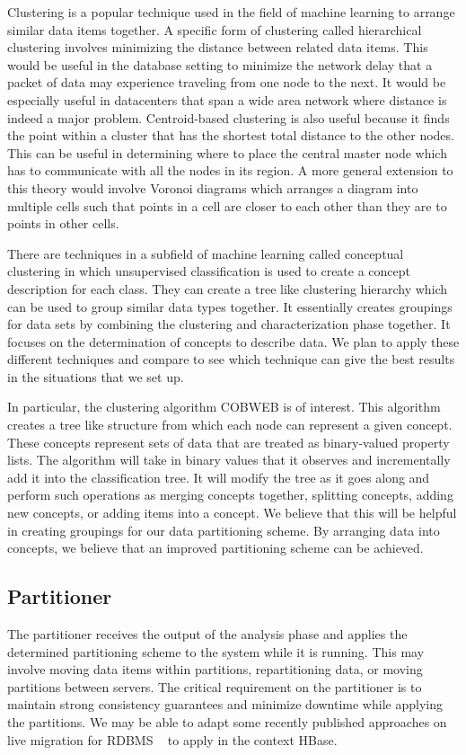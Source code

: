 \documentclass[10pt,final,journal]{IEEEtran}
\begin{document}
Clustering is a popular technique used in the field of machine learning to arrange similar data items together.  A specific form of clustering called hierarchical clustering involves minimizing the distance between related data items.  This would be useful in the database setting to minimize the network delay that a packet of data may experience traveling from one node to the next.  It would be especially useful in datacenters that span a wide area network where distance is indeed a major problem.  Centroid-based clustering is also useful because it finds the point within a cluster that has the shortest total distance to the other nodes.  This can be useful in determining where to place the central master node which has to communicate with all the nodes in its region.  A more general extension to this theory would involve Voronoi diagrams which arranges a diagram into multiple cells such that points in a cell are closer to each other than they are to points in other cells.

There are techniques in a subfield of machine learning called conceptual clustering in which unsupervised classification is used to create a concept description for each class. They can create a tree like clustering hierarchy which can be used to group similar data types together. It essentially creates groupings for data sets by combining the clustering and characterization phase together. It focuses on the determination of concepts to describe data. We plan to apply these different techniques and compare to see which technique can give the best results in the situations that we set up.

In particular, the clustering algorithm COBWEB is of interest. This algorithm creates a tree like structure from which each node can represent a given concept. These concepts represent sets of data that are treated as binary-valued property lists. The algorithm will take in binary values that it observes and incrementally add it into the classification tree. It will modify the tree as it goes along and perform such operations as merging concepts together, splitting concepts, adding new concepts, or adding items into a concept. We believe that this will be helpful in creating groupings for our data partitioning scheme. By arranging data into concepts, we believe that an improved partitioning scheme can be achieved.

\subsection{Partitioner}
The partitioner receives the output of the analysis phase and applies the determined partitioning scheme to the system while it is running. This may involve moving data items within partitions, repartitioning data, or moving partitions between servers. The critical requirement on the partitioner is to maintain strong consistency guarantees and minimize downtime while applying the partitions. We may be able to adapt some recently published approaches on live migration for RDBMS ~\cite{Das:2011:ALE:2002974.2002977, Elmore:2011:ZLM:1989323.1989356} to apply in the context HBase.
\end{document}
